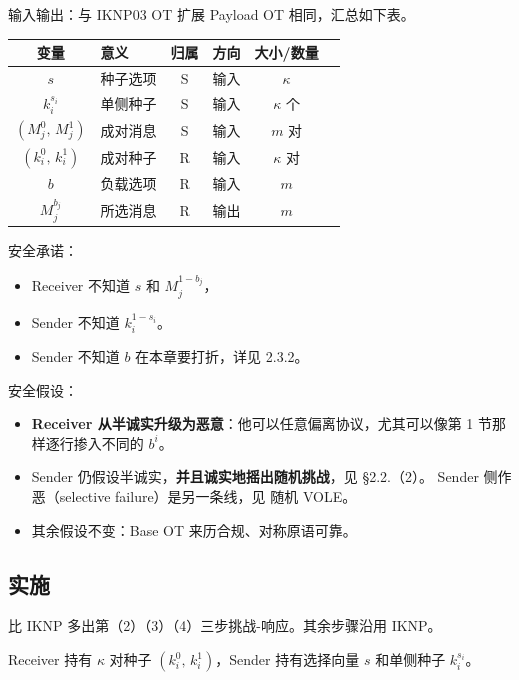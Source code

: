输入输出：与 IKNP03 OT 扩展 Payload OT 相同，汇总如下表。

\begin{longtable}[]{@{}clcccc@{}}
\toprule\noalign{}
变量 & 意义 & 归属 & 方向 & 大小/数量 & \\
\midrule\noalign{}
\endhead
\bottomrule\noalign{}
\endlastfoot
$s$ & 种子选项 & S & 输入 & $\kappa$ & \\
$k_i^{s_i}$ & 单侧种子 & S & 输入 & $\kappa$ 个 & \\
$(M^0_j,\, M^1_j)$ & 成对消息 & S & 输入 & $m$ 对 & \\
$(k^0_i,\, k^1_i)$ & 成对种子 & R & 输入 & $\kappa$ 对 & \\
$b$ & 负载选项 & R & 输入 & $m$ & \\
$M_j^{b_j}$ & 所选消息 & R & 输出 & $m$ & \\
\end{longtable}

安全承诺：

\begin{itemize}

\item
  Receiver 不知道 $s$ 和 $M_j^{1-b_j}$，
\item
  Sender 不知道 $k_i^{1-s_i}$。
\item
  Sender 不知道 $b$ 在本章要打折，详见 2.3.2。
\end{itemize}

安全假设：

\begin{itemize}

\item
  \textbf{Receiver 从半诚实升级为恶意}：他可以任意偏离协议，尤其可以像第
  1 节那样逐行掺入不同的 $b^{i}$。
\item
  Sender 仍假设半诚实，\textbf{并且诚实地摇出随机挑战}，见 §2.2.（2）。
  Sender 侧作恶（selective failure）是另一条线，见 随机 VOLE。
\item
  其余假设不变：Base OT 来历合规、对称原语可靠。
\end{itemize}

\subsection{实施}

比 IKNP 多出第（2）（3）（4）三步挑战-响应。其余步骤沿用 IKNP。

Receiver 持有 $\kappa$ 对种子 $\left(k^0_i,\, k^1_i\right)$，Sender
持有选择向量 $s$ 和单侧种子 $k^{s_i}_i$。

